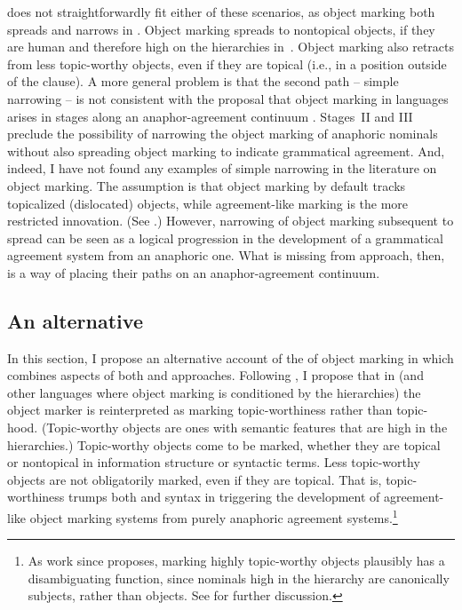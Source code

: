 \documentclass[output=paper]{LSP/langsci}
\begin{document}
 does not straightforwardly fit either of these scenarios, as
object marking both spreads and narrows in . Object marking
spreads to nontopical objects, if they are human and therefore high on
the  hierarchies in~. Object marking
also retracts from less topic-worthy objects, even if they are topical
(i.e., in a position outside of the clause). A more general problem
is that the second path – simple narrowing – is not consistent with
the proposal that object marking in  languages arises in stages
along an anaphor-agreement continuum \citep{Bresnanetal1987Topic,
 Creissels2006Typology, Givon1976Topic}.
 Stages~II and III preclude the
possibility of narrowing the object marking of anaphoric nominals
without also spreading object marking to indicate grammatical
agreement. And, indeed, I have not found any examples of simple
narrowing in the literature on  object marking. The assumption is
that object marking by default tracks topicalized (dislocated)
objects, while agreement-like marking is the more restricted
innovation. (See \eg \citealt{Riedel2009Syntax,Baxetal2012Information,
 Martenetal2012Object}.) However, narrowing of
object marking subsequent to spread can be seen as a logical
progression in the development of a grammatical agreement system from
an anaphoric one. What is missing from
 approach, then, is a way of placing
their  paths on an anaphor-agreement continuum.

\subsection{An alternative}
\label{Downing-Alternative}
In this section, I propose an alternative account of the
 of object marking in  which combines
aspects of both  and
 approaches. Following
\citet{Iemmolo2013Symmetric,Iemmolo2014Differential}, 
I propose that in  (and other  languages where object
marking is conditioned by the  hierarchies) the object
marker is reinterpreted as marking topic-worthiness rather than
topic-hood. (Topic-worthy objects are ones with semantic features that
are high in the  hierarchies.) Topic-worthy objects come to
be marked, whether they are topical or nontopical in information
structure or syntactic terms. Less topic-worthy objects are not
obligatorily marked, even if they are topical. That is,
topic-worthiness trumps both  and syntax in
triggering the development of  agreement-like object marking
systems from purely anaphoric agreement systems.\footnote{As work
 since \citet{Comrie1981Language,Comrie1989Language} proposes, marking highly
 topic-worthy objects plausibly has a disambiguating function, since
 nominals high in the  hierarchy are canonically subjects,
 rather than objects. See  for further
 discussion.}
\end{document}
